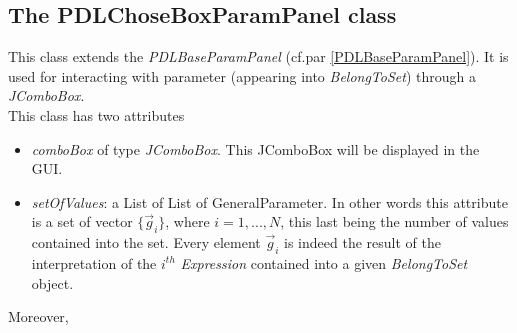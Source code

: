 \documentclass[a4paper,11pt] {ivoa}
\begin{document}
\subsection{The PDLChoseBoxParamPanel class}\label{PDLChoseBoxParamPanel}
This class extends the {\it PDLBaseParamPanel} (cf.par \ref{PDLBaseParamPanel}). It is used for interacting with parameter (appearing into {\it BelongToSet}) through a {\it JComboBox}.\\
This class has two attributes 
\begin{itemize}
\item {\it comboBox} of type {\it JComboBox}. This JComboBox will be displayed in the GUI.
\item {\it setOfValues}: a List of List of {GeneralParameter}. In other words this attribute is a set of vector $\{\vec g_i\}$, where $i=1,...,N$, this last being the number of values contained into the set. Every element $\vec g_i$ is indeed the result of the interpretation of the $i^{th}$ {\it Expression} contained into a given {\it BelongToSet} object.
\end{itemize}
Moreover, 
\end{document}
